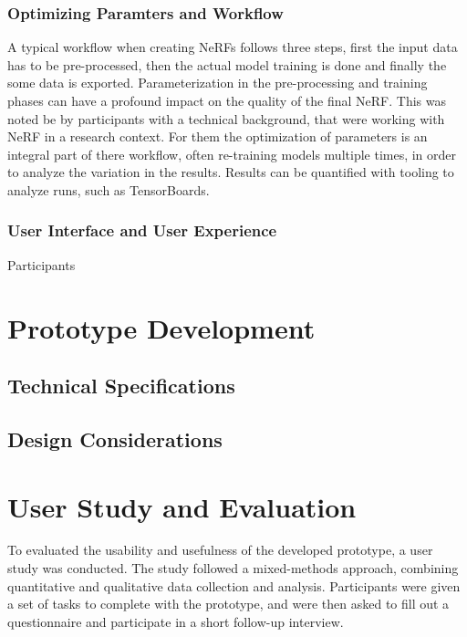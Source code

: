 \subsubsection{Optimizing Paramters and Workflow}

A typical workflow when creating NeRFs follows three steps, first the input data has to be pre-processed, then the actual model training is done and finally the some data is exported. 
Parameterization in the pre-processing and training phases can have a profound impact on the quality of the final NeRF. 
This was noted be by participants with a technical background, that were working with NeRF in a research context.
For them the optimization of parameters is an integral part of there workflow, often re-training models multiple times, in order to analyze the variation in the results.
Results can be quantified with tooling to analyze runs, such as TensorBoards.

\subsubsection{User Interface and User Experience}

Participants 

\section{Prototype Development}
\label{sec:methodology:proptotype}

\subsection{Technical Specifications}
\label{sec:methodology:proptotype:specs}

\subsection{Design Considerations}
\label{sec:methodology:proptotype:design}

\section{User Study and Evaluation}
\label{sec:methodology:study}

To evaluated the usability and usefulness of the developed prototype, a user study was conducted. 
The study followed a mixed-methods approach, combining quantitative and qualitative data collection and analysis. 
Participants were given a set of tasks to complete with the prototype, and were then asked to fill out a questionnaire and participate in a short follow-up interview.

